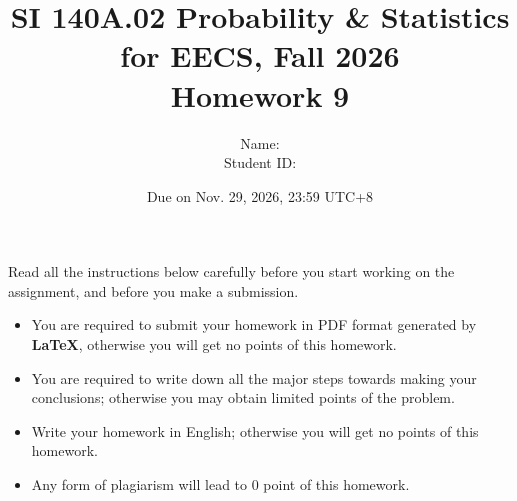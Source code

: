 \documentclass[a4paper]{article}
\author{
    Name: \textbf{\hmwkAuthorName}\\
    Student ID: \hmwkAuthorID
}
\date{}
\newcommand{\hmwkDueDate}{Nov. 29, 2026, 23:59 UTC+8}
\begin{document}
\title{
SI 140A.02 Probability \& Statistics for EECS,
Fall 2026\\
Homework 9
}

\date{Due on \hmwkDueDate}
\maketitle

Read all the instructions below carefully before you
start working on the assignment, and before you
make a submission.

\begin{itemize}
    \item You are required to submit your homework
    in PDF format generated by \textbf{LaTeX},
    otherwise you will get no points of this homework.

    \item You are required to write down all the
    major steps towards making your conclusions;
    otherwise you may obtain limited points
    of the problem.

    \item Write your homework in English;
    otherwise you will get no points of this homework.

    \item Any form of plagiarism will lead to
    $0$ point of this homework.
\end{itemize}

\newpage

\end{document}
